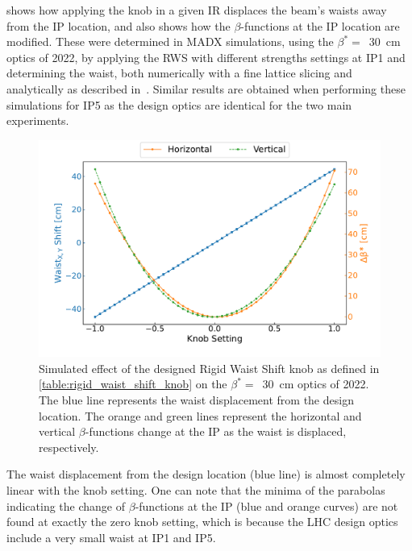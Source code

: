  shows how applying the knob in a given IR displaces the beam's waists away from the IP location, and also shows how the \(\beta\)-functions at the IP location are modified.
These were determined in \gls{MADX} simulations, using the \(\beta^{\ast} =\)~\qty{30}{\centi\metre} optics of \num{2022}, by applying the RWS with different strengths settings at IP\num{1} and determining the waist, both numerically with a fine lattice slicing and analytically as described in~\cite{PRAB:Carlier:KModulation_HiLumi}.
Similar results are obtained when performing these simulations for IP\num{5} as the design optics are identical for the two main experiments.

\begin{figure}[!htb]
    \centering
    \includegraphics[width=\textwidth]{Figures/IR_Coupling_Correction/rigid_waist_shift_waist_effect_combined.pdf}
    \caption{Simulated effect of the designed Rigid Waist Shift knob as defined in \cref{table:rigid_waist_shift_knob} on the \(\beta^{\ast} =\)~\qty{30}{\centi\metre} optics of \num{2022}. The \textcolor{mplblue}{blue} line represents the waist displacement from the design location. The \textcolor{mplorange}{orange} and \textcolor{mplgreen}{green} lines represent the horizontal and vertical \(\beta\)-functions change at the IP as the waist is displaced, respectively.}
    \label{figure:rigid_waist_shift_knob_effect_on_waist}
\end{figure}

The waist displacement from the design location (\textcolor{mplblue}{blue} line) is almost completely linear with the knob setting.
One can note that the minima of the parabolas indicating the change of \(\beta\)-functions at the IP (\textcolor{mplblue}{blue} and \textcolor{mplorange}{orange} curves) are not found at exactly the zero knob setting, which is because the LHC design optics include a very small waist at IP\num{1} and IP\num{5}.

